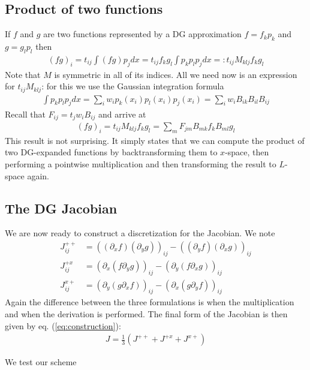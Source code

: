 \documentclass[a4paper,12pt]{scrartcl}
\begin{document}
\subsection{ Product of two functions }
If $f$ and $g$ are two functions represented by a DG approximation $f = f_kp_k$ and
$g = g_lp_l$ then 
\begin{align}
    (fg)_i = t_{ij}\int (fg)p_j dx = t_{ij} f_k g_l \int p_k p_l p_j dx =: t_{ij} M_{klj} f_k g_l
    \label{}
\end{align}
Note that $M$ is symmetric in all of its indices. All we need now is an expression for
$t_{ij}M_{klj}$: for this we use the Gaussian integration formula
\begin{align}
    \int p_k p_l p_j dx = \sum_i w_i p_k(x_i)p_l(x_i)p_j(x_i) = \sum_i w_i B_{ik}B_{il}B_{ij}
    \label{}
\end{align}
Recall that $F_{ij} = t_j w_i B_{ij}$ and arrive at
\begin{align}
    (fg)_i = t_{ij} M_{klj} f_k g_l = \sum_m F_{jm} B_{mk}f_k B_{ml}g_l
    \label{}
\end{align}
This result is not surprising. It simply states that we can compute the product
of two DG-expanded functions by backtransforming them to $x$-space, then performing
a pointwise multiplication and then transforming the result to $L$-space again.
\subsection{ The DG Jacobian}
We are now ready to construct a discretization for the Jacobian. 
We note 
\begin{subequations}
    \begin{align}
        J^{++}_{ij} &= ((\partial_x f)(\partial_y g))_{ij} - ((\partial_y f)(\partial_x g))_{ij} \\
        J^{+x}_{ij} &= (\partial_x ( f\partial_y g))_{ij} - (\partial_y (f\partial_x g))_{ij} \\
        J^{x+}_{ij} &= (\partial_y (g\partial_x f))_{ij} - (\partial_x( g\partial_y f))_{ij}
        \label{}
    \end{align}
    \label{}
\end{subequations}
Again the difference between the three formulations is when the multiplication
and when the derivation is performed. 
The final form of the Jacobian is then given by eq. (\ref{eq:construction}):
\begin{align}
    J = \frac{1}{3}(J^{++} + J^{+x} + J^{x+})
    \label{}
\end{align}

We test our scheme
\end{document}
